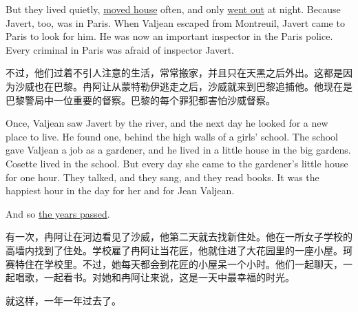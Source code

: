 \documentclass[fontset=ubuntu, zihao=5]{ctexart}
\begin{document}
\begin{paracol}{2}
  But they lived quietly, \uline{moved house} often, and only \uline{went out} at night. Because Javert, too, was in Paris. When Valjean escaped from Montreuil, Javert came to Paris to look for him. He was now an important inspector in the Paris police. Every criminal in Paris was afraid of inspector Javert.

  \switchcolumn

  不过，他们过着不引人注意的生活，常常搬家，并且只在天黑之后外出。这都是因为沙威也在巴黎。冉阿让从蒙特勒伊逃走之后，沙威就来到巴黎追捕他。他现在是巴黎警局中一位重要的督察。巴黎的每个罪犯都害怕沙威督察。

  \switchcolumn*

  Once, Valjean saw Javert by the river, and the next day he looked for a new place to live. He found one, behind the high walls of a girls' school. The school gave Valjean a job as a gardener, and he lived in a little house in the big gardens. Cosette lived in the school. But every day she came to the gardener's little house for one hour. They talked, and they sang, and they read books. It was the happiest hour in the day for her and for Jean Valjean.

  And so \uline{the years passed}.

  \switchcolumn

  有一次，冉阿让在河边看见了沙威，他第二天就去找新住处。他在一所女子学校的高墙内找到了住处。学校雇了冉阿让当花匠，他就住进了大花园里的一座小屋。珂赛特住在学校里。不过，她每天都会到花匠的小屋呆一个小时。他们一起聊天，一起唱歌，一起看书。对她和冉阿让来说，这是一天中最幸福的时光。

  就这样，一年一年过去了。

\end{paracol}

\clearpage
\end{document}

